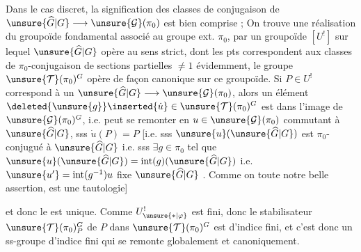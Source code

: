 Dans le cas discret, la signification des classes de
conjugaison de 
$\unsure{\widehat G|G}\longrightarrow\unsure{\mathcal G}(\pi_0)$ est bien comprise ;
On trouve une  réalisation
 du groupoïde fondamental
associé au
groupe ext. $\pi_0$, par un groupoïde  $[U^{!}]$
sur lequel $\unsure{\widehat G|G}$ opère au sens strict, dont les pts
correspondent aux classes de $\pi_0$-conjugaison de sections
partielles $\ne1$ évidemment, le groupe
$\unsure{\mathcal T}(\pi_0)^G$
opère de façon  canonique sur ce groupoïde.
Si $P\in U^{!}$ correspond à un 
$\unsure{\widehat G|G}\longrightarrow\unsure{\mathcal G}(\pi_0)$, alors
un élément $\deleted{\unsure{g}}\inserted{\dot u}\in
\unsure{\mathcal T}(\pi_0)^G$ est dans l'image de
$\unsure{\mathcal G}(\pi_0)^G$, i.e. peut se remonter en
$u\in\unsure{\mathcal G}(\pi_0)$ commutant à $\unsure{\widehat G|G}$, sss
$\dot u(P)=P$ [i.e. sss
$\unsure{u}(\unsure{\widehat G|G})$ est $\pi_0$-conjugué à $\unsure{\widehat G|G}$
i.e. sss $\exists g\in\pi_0$ tel que
$\unsure{u}(\unsure{\widehat G|G})=\operatorname{int}(g)(\unsure{\widehat G|G})$
i.e. 
$\unsure{u'}=\operatorname{int}(g^{-1})u$ fixe $\unsure{\widehat G|G}$
.
 Comme on  
 toute notre belle assertion, est une tautologie]

et donc le  est unique. Comme
$U^{!}_{\unsure{*|\varphi}}$ est fini, donc le stabilisateur
$\unsure{\mathcal T}(\pi_0)^G_P$ de $P$ dans
$\unsure{\mathcal T}(\pi_0)^G$ est d'indice fini,
et c'est donc un ss-groupe d'indice fini qui se remonte
globalement et canoniquement.

